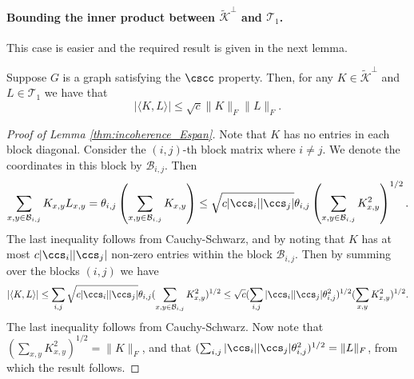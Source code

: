\paragraph{Bounding  the inner product between $\tilde{\mathcal{K}}^\perp$ and $\mathcal{T}_1$.}  This case is easier and the required result is given in the next lemma. 
\begin{lemma}\label{thm:incoherence_Espan}
Suppose $G$ is a graph satisfying the $\cscc$ property.  Then, for any  $K \in \tilde{\mathcal{K}}^\perp$ and $L\in \mathcal{T}_1$ we  have that
$$|\langle K, L \rangle | \leq \sqrt{c} \| K \|_F \| L \|_F .$$
%
\end{lemma}

\begin{proof}[Proof of Lemma \ref{thm:incoherence_Espan}]
Note that $K$ has no entries in each block diagonal.  Consider the $(i,j)$-th block matrix where $i \neq j$.  We denote the coordinates in this block by $\mathcal{B}_{i,j}$.  Then
$$
\sum_{x,y \in \mathcal{B}_{i,j}} K_{x,y} L_{x,y} = \theta_{i,j} \left( \sum_{x,y \in \mathcal{B}_{i,j}} K_{x,y} \right) \leq \sqrt{c |\ccs_i| |\ccs_j|} \theta_{i,j} \left( \sum_{x,y \in \mathcal{B}_{i,j}} K_{x,y}^2 \right)^{1/2}.
$$
The last inequality follows from Cauchy-Schwarz, and by noting that $K$ has at most $c |\ccs_i| |\ccs_j|$ non-zero entries within the block $\mathcal{B}_{i,j}$.  Then by summing over the blocks $(i,j)$ we have
$$
|\langle K,L \rangle| \leq \sum_{i,j} \sqrt{c|\ccs_i| |\ccs_j|} \theta_{i,j} ( \sum_{x,y \in \mathcal{B}_{i,j}} K_{x,y}^2 )^{1/2} \leq \sqrt{c} (\sum_{i,j} |\ccs_i| |\ccs_j|\theta_{i,j}^2)^{1/2} ( \sum_{x,y} K_{x,y}^2 )^{1/2}.
$$
The last inequality follows from Cauchy-Schwarz.  Now note that $( \sum_{x,y} K_{x,y}^2 )^{1/2} = \|K\|_F$, and that $(\sum_{i,j} |\ccs_i| |\ccs_j| \theta_{i,j}^2)^{1/2} = \|L\|_F $, from which the result follows.
\end{proof}



